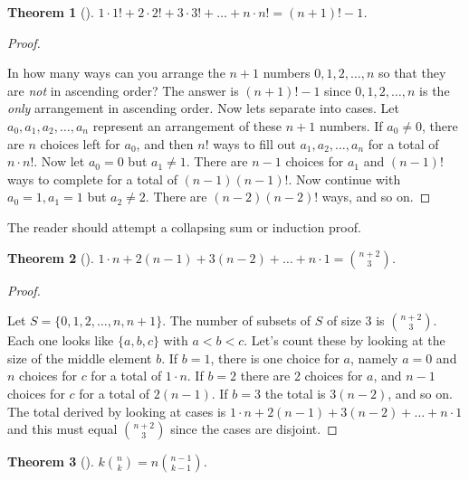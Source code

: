 \documentclass[10pt,]{book}
\theoremstyle{plain}
\newtheorem{theorem}{Theorem}[section]
\theoremstyle{definition}
\theoremstyle{definition}
\numberwithin{equation}{chapter}
\newcommand{\lt}{<}
\begin{document}
\begin{theorem}[{}]\label{theorem-16}
\hypertarget{p-309}{}%
\(1 \cdot 1! + 2 \cdot 2! + 3 \cdot 3! + \ldots + n \cdot n! = \left( n + 1 \right)! - 1\).%
\end{theorem}
\begin{proof}\hypertarget{proof-14}{}
\hypertarget{p-310}{}%
In how many ways can you arrange the \(n+1\) numbers \(0, 1, 2, \ldots, n\) so that they are \emph{not} in ascending order? The answer is \(\left( n + 1 \right)! - 1\) since \(0, 1, 2, \ldots, n\) is the \emph{only} arrangement in ascending order. Now lets separate into cases. Let \(a_{0},a_{1},a_{2},\ldots,a_{n}\) represent an arrangement of these \(n+1\) numbers. If \(a_{0} \neq 0\), there are \(n\) choices left for \(a_{0}\), and then \(n!\) ways to fill out \(a_{1},a_{2},\ldots,a_{n}\) for a total of \(n \cdot n!\). Now let \(a_{0} = 0\) but \(a_{1} \neq 1\). There are \(n - 1\) choices for \(a_{1}\) and \(\left(n - 1 \right)!\) ways to complete for a total of \(\left(n - 1 \right)\left(n - 1 \right)!\). Now continue with \(a_{0} = 1,a_{1} = 1\) but \(a_{2} \neq 2\). There are \(\left(n - 2 \right)\left(n - 2 \right)!\) ways, and so on.%
\end{proof}
\hypertarget{p-311}{}%
The reader should attempt a collapsing sum or induction proof.%
\begin{theorem}[{}]\label{theorem-17}
\hypertarget{p-312}{}%
\(1 \cdot n + 2\left( n - 1 \right) + 3\left( n - 2 \right) + \ldots + n \cdot 1 = \binom{n + 2}{3}\).%
\end{theorem}
\begin{proof}\hypertarget{proof-15}{}
\hypertarget{p-313}{}%
Let \(S = \{0,1,2,\ldots,n,n + 1\}\). The number of subsets of \(S\) of size 3 is \(\binom{n + 2}{3}\). Each one looks like \(\{a, b, c\}\) with \(a \lt b \lt c\). Let's count these by looking at the size of the middle element \(b\). If \(b=1\), there is one choice for \(a\), namely \(a=0\) and \(n\) choices for \(c\) for a total of \(1 \cdot n\). If \(b=2\) there are 2 choices for \(a\), and \(n - 1\) choices for \(c\) for a total of \(2(n - 1)\). If \(b=3\) the total is \(3(n - 2)\), and so on. The total derived by looking at cases is \(1 \cdot n + 2\left( n - 1 \right) + 3\left( n - 2 \right) + \ldots + n \cdot 1\) and this must equal \(\binom{n + 2}{3}\) since the cases are disjoint.%
\end{proof}
\begin{theorem}[{}]\label{theorem-18}
\hypertarget{p-314}{}%
\(k \binom{n}{k} = n \binom{n - 1}{k - 1}\).%
\end{theorem}
\end{document}
